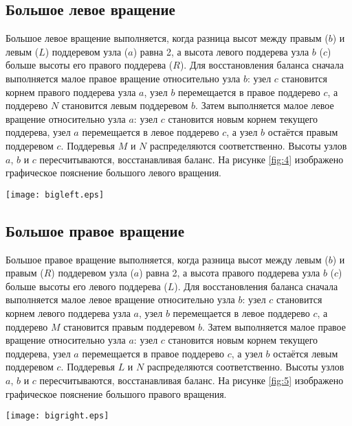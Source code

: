 \subsection{Большое левое вращение}
Большое левое вращение выполняется, когда разница высот между правым ($b$) и левым ($L$) поддеревом узла ($a$) равна 2, а высота левого поддерева узла $b$ ($c$) больше высоты его правого поддерева ($R$). Для восстановления баланса сначала выполняется малое правое вращение относительно узла $b$: узел $c$ становится корнем правого поддерева узла $a$, узел $b$ перемещается в правое поддерево $c$, а поддерево $N$ становится левым поддеревом $b$. Затем выполняется малое левое вращение относительно узла $a$: узел $c$ становится новым корнем текущего поддерева, узел $a$ перемещается в левое поддерево $c$, а узел $b$ остаётся правым поддеревом $c$. Поддеревья $M$ и $N$ распределяются соответственно. Высоты узлов $a$, $b$ и $c$ пересчитываются, восстанавливая баланс. На рисунке \ref{fig:4} изображено графическое пояснение большого левого вращения. \newpage
\begin{center}
	\texttt{[image: bigleft.eps]}
	\label{fig:4}
\end{center}

\subsection{Большое правое вращение}
Большое правое вращение выполняется, когда разница высот между левым ($b$) и правым ($R$) поддеревом узла ($a$) равна 2, а высота правого поддерева узла $b$ ($c$) больше высоты его левого поддерева ($L$). Для восстановления баланса сначала выполняется малое левое вращение относительно узла $b$: узел $c$ становится корнем левого поддерева узла $a$, узел $b$ перемещается в левое поддерево $c$, а поддерево $M$ становится правым поддеревом $b$. Затем выполняется малое правое вращение относительно узла $a$: узел $c$ становится новым корнем текущего поддерева, узел $a$ перемещается в правое поддерево $c$, а узел $b$ остаётся левым поддеревом $c$. Поддеревья $L$ и $N$ распределяются соответственно. Высоты узлов $a$, $b$ и $c$ пересчитываются, восстанавливая баланс.
На рисунке \ref{fig:5} изображено графическое пояснение большого правого вращения.
\begin{center}
	\texttt{[image: bigright.eps]}
	\label{fig:5}
\end{center}
\clearpage
